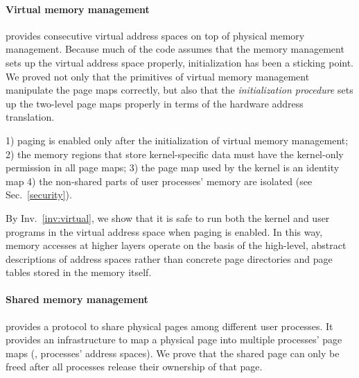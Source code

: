 {\vspace{-3pt}
\paragraph{Virtual memory management}
provides consecutive virtual address spaces on top of physical memory management.
Because much of the code assumes that 
the memory management sets up the virtual address space properly,
initialization has been a sticking point.
We proved not only that the primitives of virtual memory management
manipulate the page maps correctly,
but also that the \emph{initialization procedure} sets up the two-level page maps properly
in terms of the hardware address translation.


\begin{invariant}
\label{inv:virtual}
1) paging is enabled only after the initialization of virtual memory management;
2) the memory regions that store kernel-specific data must have the kernel-only 
permission in all page maps;
3) the page map used by the kernel is an identity map
4) the non-shared parts of user processes' memory are isolated (see 
Sec.~\ref{security}).
\end{invariant}


By Inv.~\ref{inv:virtual}, we show that it is safe to
run both the kernel and user programs in the virtual 
address space when paging is enabled.
In this way, memory accesses at higher layers
operate on the basis of
the high-level, abstract descriptions of address spaces
rather than concrete page directories and page tables stored in the memory
itself.


\vspace{-3pt}
\paragraph{Shared memory management} provides a protocol to share physical
pages among different user processes. 
It provides an infrastructure to map a physical page into multiple
processes' page maps (\ie, processes' address spaces).
We prove that the shared page can only be freed after 
all processes release their ownership of that page.



}

